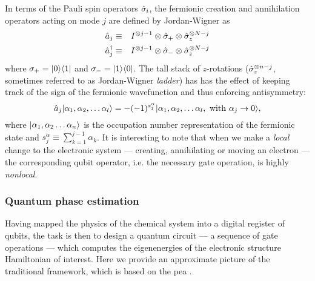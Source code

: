 In terms of the Pauli spin operators $\hat{\sigma}_i$, the fermionic creation and annihilation operators acting on mode $j$ are defined by Jordan-Wigner as 
\begin{eqnarray}
    \hat{a}_j &\equiv& I^{\otimes j-1} \otimes \hat{\sigma}_{+} \otimes \hat{\sigma}_z^{\otimes N-j}\\
    \hat{a}^{\dagger}_j &\equiv& I^{\otimes j-1} \otimes \hat{\sigma}_{-} \otimes \hat{\sigma}_z^{\otimes N-j}
\end{eqnarray}
where $\sigma_+ = \mbox{$ | 0 \rangle $}\mbox{$ \langle 1 | $}$ and  $\sigma_- = \mbox{$ | 1 \rangle $}\mbox{$ \langle 0 | $}$. The tall stack of $z$-rotations 
($\hat{\sigma}_z^{\otimes n-j}$, sometimes referred to as Jordan-Wigner \emph{ladder}) has has the effect of keeping track of the sign of the fermionic wavefunction and thus enforcing antisymmetry:
\begin{equation}
    \hat{a}_j \mbox{$ | \alpha_1, \alpha_2, \ldots \alpha_l \rangle $} = -(-1)^{s_j^\alpha}\mbox{$ | \alpha_1, \alpha_2, \ldots \alpha_l,~ \mathrm{with}~ \alpha_j \rightarrow 0  \rangle $},
\end{equation}
where $\mbox{$ | \alpha_1, \alpha_2 \ldots \alpha_n \rangle $}$  is the occupation number representation of the fermionic state and $s_j^\alpha \equiv \sum_{k=1}^{j-1}\alpha_k$. It is interesting to note that when we make a \emph{local} change to the electronic system --- creating, annihilating or moving an electron --- the corresponding qubit operator, i.e. the necessary gate operation, is highly \emph{nonlocal}. 


\subsubsection{Quantum phase estimation}
Having mapped the physics of the chemical system into a digital register of qubits, the task is then to design a quantum circuit --- a sequence of gate operations --- which computes the eigenenergies of the electronic structure Hamiltonian of interest. Here we provide an approximate picture of the traditional framework, which is based on the \gls{pea} \cite{Kitaev2002a, Nielsen2004}.

